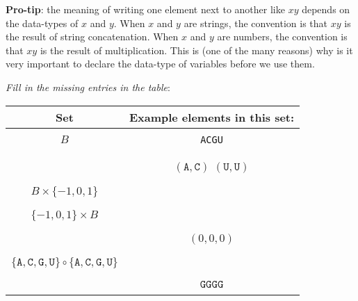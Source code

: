 \documentclass[12pt, oneside]{article}
\newcommand{\A}[0]{\texttt{A}}
\newcommand{\C}[0]{\texttt{C}}
\newcommand{\G}[0]{\texttt{G}}
\newcommand{\U}[0]{\texttt{U}}
\begin{document}
{\bf Pro-tip}: the meaning of writing one element next to another like $xy$ depends on the data-types of $x$ and 
$y$. When $x$ and $y$ are strings, the convention is that $xy$ is the result of string concatenation. 
When $x$ and $y$ are numbers, the convention is that $xy$ is the result of multiplication. This is 
(one of the many reasons) why is it very important to declare the data-type of variables before we use them.

{\it Fill in the missing entries in the table}:

\begin{center}
\begin{tabular}{cc}
{\bf  Set} & {\bf Example elements in this set}:\\
\hline 
& \\
$B$ &\A \qquad \C \qquad \G \qquad \U \\
& \\
\hline
& \\
\phantom{$B \times B$} & $(\A, \C)$ \qquad $(\U, \U)$\\
& \\
\hline
& \\
$B \times \{-1,0,1\}$ & \\
& \\
\hline
& \\
$\{-1,0,1\} \times B$ & \\
& \\
\hline
& \\
\phantom{$\{-1,0,1\} \times \{-1,0,1\}  \times \{-1,0,1\} $} & \qquad $(0,0,0)$ \\
& \\
\hline
& \\
$ \{\A, \C, \G, \U \} \circ  \{\A, \C, \G, \U \}$& \\
& \\
\hline
& \\
\phantom{$\{G\} \circ \{G\} \circ \{G\}$} & \qquad $\G\G\G\G$ \\
& \\
\hline

\end{tabular}
\end{center}

\vfill 
\end{document}
